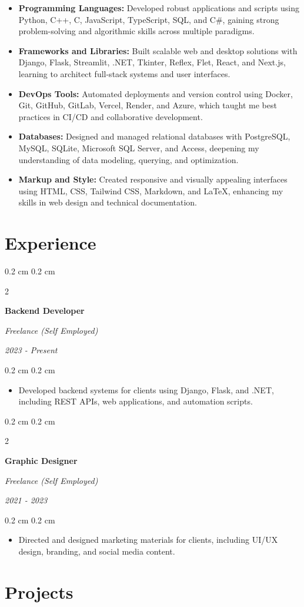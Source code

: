\documentclass[10pt, a4paper]{article}
\newenvironment{highlights}{
    \begin{itemize}[
        topsep=0.1 cm,
        parsep=0.1 cm,
        partopsep=0pt,
        itemsep=0pt,
        leftmargin=0.4 cm + 10pt
    ]
}{
    \end{itemize}
} %
\newenvironment{onecolentry}{
    \begin{adjustwidth}{
        0.2 cm
    }{
        0.2 cm
    }
}{
    \end{adjustwidth}
} %
\newenvironment{twocolentry}[2][]{
    \onecolentry
    \def\secondColumn{#2}
    \begin{paracol}{2}
}{
    \switchcolumn \raggedleft \secondColumn
    \end{paracol}
    \endonecolentry
} %
\newcommand{\createpointblock}[5]{
    \begin{twocolentry}{
        \textit{#2}

        \textit{#4}}
        \textbf{#1}

        \textit{#3}
    \end{twocolentry}

    \vspace{0.1 cm}
    \begin{onecolentry}
        \begin{highlights}
            #5
        \end{highlights}
    \end{onecolentry}
}
\begin{document}
    \begin{itemize}
        \item \textbf{Programming Languages:} Developed robust applications and scripts using Python, C++, C, JavaScript, TypeScript, SQL, and C\#, gaining strong problem-solving and algorithmic skills across multiple paradigms.
        \item \textbf{Frameworks and Libraries:} Built scalable web and desktop solutions with Django, Flask, Streamlit, .NET, Tkinter, Reflex, Flet, React, and Next.js, learning to architect full-stack systems and user interfaces.
        \item \textbf{DevOps Tools:} Automated deployments and version control using Docker, Git, GitHub, GitLab, Vercel, Render, and Azure, which taught me best practices in CI/CD and collaborative development.
        \item \textbf{Databases:} Designed and managed relational databases with PostgreSQL, MySQL, SQLite, Microsoft SQL Server, and Access, deepening my understanding of data modeling, querying, and optimization.
        \item \textbf{Markup and Style:} Created responsive and visually appealing interfaces using HTML, CSS, Tailwind CSS, Markdown, and LaTeX, enhancing my skills in web design and technical documentation.
    \end{itemize}

\section{Experience}

    \createpointblock{Backend Developer}{2023 - Present}{Freelance (Self Employed)}{}
    {%
    \item Developed backend systems for clients using Django, Flask, and .NET, including REST APIs, web applications, and automation scripts.
    }
    
    \vspace{0.2 cm}
    
    \createpointblock{Graphic Designer}{2021 - 2023}{Freelance (Self Employed)}{}
    {%
        \item Directed and designed marketing materials for clients, including UI/UX design, branding, and social media content.
    }
    
\section{Projects}
\end{document}
